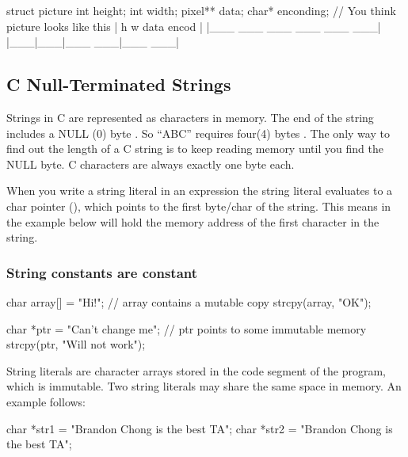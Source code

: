 \begin{code}[language=C]
struct picture{
    int height;
    int width;
    pixel** data;
    char* enconding;
}
// You think picture looks like this
| h   w    data   encod |
|___ ___ ___ ___ ___ ___|
|___|___|___ ___|___ ___|

\end{code}

\subsection{C Null-Terminated Strings}

Strings in C are represented as characters in memory. The end of the string includes a NULL (0) byte \cite{CITATION_NEEDED}. So ``ABC'' requires four(4) bytes .
The only way to find out the length of a C string is to keep reading memory until you find the NULL byte. C characters are always exactly one byte each.

When you write a string literal  in an expression the string literal evaluates to a char pointer (), which points to the first byte/char of the string. This means  in the example below will hold the memory address of the first character in the string.

\subsubsection{String constants are constant}

\begin{code}[language=C]
char array[] = "Hi!"; // array contains a mutable copy 
strcpy(array, "OK");

char *ptr = "Can't change me"; // ptr points to some immutable memory
strcpy(ptr, "Will not work");
\end{code}

String literals are character arrays stored in the code segment of the program, which is immutable. Two string literals may share the same space in memory. An example follows:

\begin{code}[language=C]
char *str1 = "Brandon Chong is the best TA";
char *str2 = "Brandon Chong is the best TA";
\end{code}

